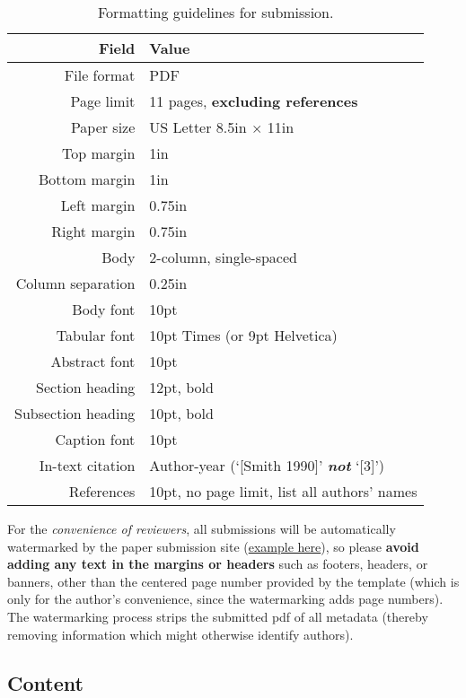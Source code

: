 \documentclass[pldi]{sigplanconf}
\begin{document}
\begin{table}[t!]
  \centering
{  \sffamily\small %
  \begin{tabular}{rl}
    \textbf{Field} & \textbf{Value}\\
    \hline
    File format & PDF \\
    Page limit & 11 pages, \textbf{excluding references}\\
    Paper size & US Letter 8.5in $\times$ 11in\\
    Top margin & 1in\\
    Bottom margin & 1in\\
    Left margin & 0.75in\\
    Right margin & 0.75in\\
    Body & 2-column, single-spaced\\
    Column separation & 0.25in\\
    Body font & 10pt\\
    Tabular font & 10pt Times (or 9pt Helvetica)\\
    Abstract font & 10pt\\
    Section heading  & 12pt, bold\\
    Subsection heading  & 10pt, bold\\
    Caption font & 10pt\\
    In-text citation & Author-year (`[Smith 1990]' \emph{\textbf{not}} `[3]') \\
    References & 10pt, no page limit, list all authors' names\\
  \end{tabular}
}
  \caption{Formatting guidelines for submission. }
  \label{table:formatting}
\end{table}

For the \emph{convenience of reviewers}, all submissions will be
automatically watermarked by the paper submission site
(\href{http://conf.researchr.org/getImage/pldi2015/orig/pldi15-template-wm.pdf}{example
  here}), so please \textbf{avoid adding any text in the margins or
  headers} such as footers, headers, or banners, 
other than the centered page number provided by the template (which is
only for the author's convenience, since the watermarking adds page
numbers).  The watermarking process strips the submitted pdf of all
metadata (thereby removing information which might otherwise identify authors).

\subsection{Content}
\end{document}
